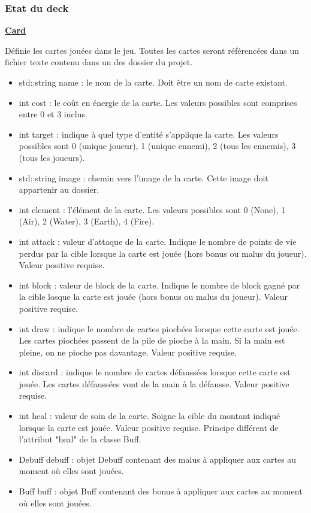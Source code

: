 \subsubsection{Etat du deck}
\underline{\textbf{Card}}
\par Définie les cartes jouées dans le jeu. Toutes les cartes seront référencées dans un fichier texte contenu dans un des dossier du projet.
\begin{itemize}
    \item std::string name : le nom de la carte. Doit être un nom de carte existant.
    \item int cost : le coût en énergie de la carte. Les valeurs possibles sont comprises entre 0 et 3 inclus. 
    \item int target : indique à quel type d'entité s'applique la carte. Les valeurs possibles sont 0 (unique joueur), 1 (unique ennemi), 2 (tous les ennemis), 3 (tous les joueurs).
    \item std::string image : chemin vers l'image de la carte. Cette image doit appartenir au dossier.
    \item int element : l'élément de la carte. Les valeurs possibles sont 0 (None), 1 (Air), 2 (Water), 3 (Earth), 4 (Fire). 
    \item int attack : valeur d'attaque de la carte. Indique le nombre de points de vie perdus par la cible lorsque la carte est jouée (hors bonus ou malus du joueur). Valeur positive requise.
    \item int block : valeur de block de la carte. Indique le nombre de block gagné par la cible losque la carte est jouée (hors bonus ou malus du joueur). Valeur positive requise. 
    \item int draw : indique le nombre de cartes piochées lorsque cette carte est jouée. Les cartes piochées passent de la pile de pioche à la main. Si la main est pleine, on ne pioche pas davantage. Valeur positive requise.
    \item int discard : indique le nombre de cartes défaussées lorsque cette carte est jouée. Les cartes défaussées vont de la main à la défausse. Valeur positive requise.
    \item int heal : valeur de soin de la carte. Soigne la cible du montant indiqué lorsque la carte est jouée. Valeur positive requise. Principe différent de l'attribut "heal" de la classe Buff.
    \item Debuff debuff : objet Debuff contenant des malus à appliquer aux cartes au moment où elles sont jouées.
    \item Buff buff : objet Buff contenant des bonus à appliquer aux cartes au moment où elles sont jouées.
\end{itemize}


